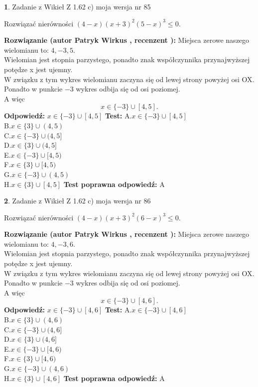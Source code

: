 \documentclass[12pt, a4paper]{article}
\theoremstyle{definition} %
\newtheorem{zad}{}
\newcommand{\zadStart}[1]{\begin{zad}#1\newline}
\newcommand{\zadStop}{\end{zad}}
\newcommand{\rozwStart}[2]{\noindent \textbf{Rozwiązanie (autor #1 , recenzent #2): }\newline}
\newcommand{\rozwStop}{\newline}
\newcommand{\odpStart}{\noindent \textbf{Odpowiedź:}\newline}
\newcommand{\odpStop}{\newline}
\newcommand{\testStart}{\noindent \textbf{Test:}\newline}
\newcommand{\testStop}{\newline}
\newcommand{\kluczStart}{\noindent \textbf{Test poprawna odpowiedź:}\newline}
\newcommand{\kluczStop}{\newline}
\begin{document}
\zadStart{Zadanie z Wikieł Z 1.62 c) moja wersja nr 85}

Rozwiązać nierówności $(4-x)(x+3)^{2}(5-x)^{3}\le0$.
\zadStop
\rozwStart{Patryk Wirkus}{}
Miejsca zerowe naszego wielomianu to: $4, -3, 5$.\\
Wielomian jest stopnia parzystego, ponadto znak współczynnika przy\linebreak najwyższej potędze x jest ujemny.\\ W związku z tym wykres wielomianu zaczyna się od lewej strony powyżej osi OX.\\
Ponadto w punkcie $-3$ wykres odbija się od osi poziomej.\\
A więc $$x \in \{-3\} \cup [4,5].$$
\rozwStop
\odpStart
$x \in \{-3\} \cup [4,5]$
\odpStop
\testStart
A.$x \in \{-3\} \cup [4,5]$\\
B.$x \in \{3\} \cup (4,5)$\\
C.$x \in \{-3\} \cup (4,5]$\\
D.$x \in \{3\} \cup (4,5]$\\
E.$x \in \{-3\} \cup [4,5)$\\
F.$x \in \{3\} \cup [4,5)$\\
G.$x \in \{-3\} \cup (4,5)$\\
H.$x \in \{3\} \cup [4,5]$
\testStop
\kluczStart
A
\kluczStop



\zadStart{Zadanie z Wikieł Z 1.62 c) moja wersja nr 86}

Rozwiązać nierówności $(4-x)(x+3)^{2}(6-x)^{3}\le0$.
\zadStop
\rozwStart{Patryk Wirkus}{}
Miejsca zerowe naszego wielomianu to: $4, -3, 6$.\\
Wielomian jest stopnia parzystego, ponadto znak współczynnika przy\linebreak najwyższej potędze x jest ujemny.\\ W związku z tym wykres wielomianu zaczyna się od lewej strony powyżej osi OX.\\
Ponadto w punkcie $-3$ wykres odbija się od osi poziomej.\\
A więc $$x \in \{-3\} \cup [4,6].$$
\rozwStop
\odpStart
$x \in \{-3\} \cup [4,6]$
\odpStop
\testStart
A.$x \in \{-3\} \cup [4,6]$\\
B.$x \in \{3\} \cup (4,6)$\\
C.$x \in \{-3\} \cup (4,6]$\\
D.$x \in \{3\} \cup (4,6]$\\
E.$x \in \{-3\} \cup [4,6)$\\
F.$x \in \{3\} \cup [4,6)$\\
G.$x \in \{-3\} \cup (4,6)$\\
H.$x \in \{3\} \cup [4,6]$
\testStop
\kluczStart
A
\kluczStop
\end{document}
